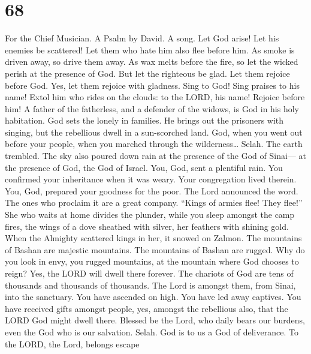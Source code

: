 \hypertarget{section-67}{%
\section{68}\label{section-67}}

For the Chief Musician. A Psalm by David. A song.  Let God
arise! Let his enemies be scattered! Let them who hate him also flee
before him.  As smoke is driven away, so drive them away.
As wax melts before the fire, so let the wicked perish at the presence
of God.  But let the righteous be glad. Let them rejoice
before God. Yes, let them rejoice with gladness.  Sing to
God! Sing praises to his name! Extol him who rides on the clouds: to the
LORD, his name! Rejoice before him!  A father of the
fatherless, and a defender of the widows, is God in his holy habitation.
 God sets the lonely in families. He brings out the
prisoners with singing, but the rebellious dwell in a sun-scorched land.
 God, when you went out before your people, when you
marched through the wilderness\ldots{} Selah.  The earth
trembled. The sky also poured down rain at the presence of the God of
Sinai--- at the presence of God, the God of Israel.  You,
God, sent a plentiful rain. You confirmed your inheritance when it was
weary.  Your congregation lived therein. You, God,
prepared your goodness for the poor.  The Lord announced
the word. The ones who proclaim it are a great company. 
``Kings of armies flee! They flee!'' She who waits at home divides the
plunder,  while you sleep amongst the camp fires, the
wings of a dove sheathed with silver, her feathers with shining gold.
 When the Almighty scattered kings in her, it snowed on
Zalmon.  The mountains of Bashan are majestic mountains.
The mountains of Bashan are rugged.  Why do you look in
envy, you rugged mountains, at the mountain where God chooses to reign?
Yes, the LORD will dwell there forever.  The chariots of
God are tens of thousands and thousands of thousands. The Lord is
amongst them, from Sinai, into the sanctuary.  You have
ascended on high. You have led away captives. You have received gifts
amongst people, yes, amongst the rebellious also, that the LORD God
might dwell there.  Blessed be the Lord, who daily bears
our burdens, even the God who is our salvation. Selah. 
God is to us a God of deliverance. To the LORD, the Lord, belongs escape
